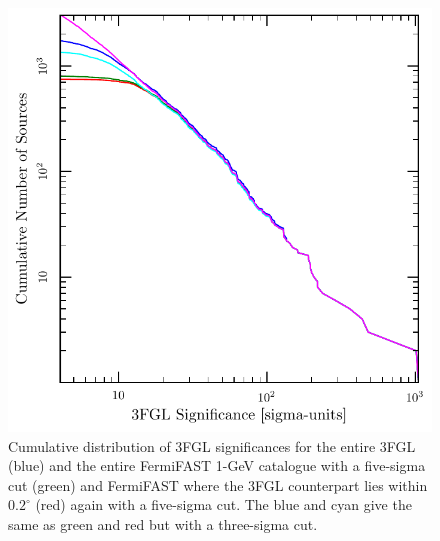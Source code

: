 \documentclass[useAMS,usenatbib]{mn2e}
\begin{document}
\begin{figure}
\includegraphics[width=\columnwidth]{sign-dist}
\caption{
  Cumulative distribution of 3FGL significances for the entire 3FGL
  (blue) and the entire FermiFAST 1-GeV catalogue with a five-sigma
  cut (green) and FermiFAST where the 3FGL counterpart lies within
  $0.2^\circ$ (red) again with a five-sigma cut.  The blue and cyan
  give the same as green and red but with a three-sigma cut.}
\label{fig:sign-dist}
\end{figure}
\end{document}
